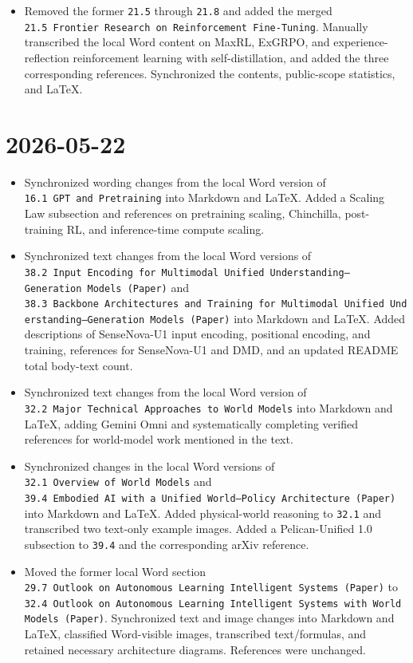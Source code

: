 \begin{itemize}
\item
  Removed the former \texttt{21.5} through \texttt{21.8} and added the merged \texttt{21.5\ Frontier\ Research\ on\ Reinforcement\ Fine-Tuning}. Manually transcribed the local Word content on MaxRL, ExGRPO, and experience-reflection reinforcement learning with self-distillation, and added the three corresponding references. Synchronized the contents, public-scope statistics, and LaTeX.
\end{itemize}

\hypertarget{section-3}{%
\section{2026-05-22}\label{section-3}}

\begin{itemize}
\tightlist
\item
  Synchronized wording changes from the local Word version of \texttt{16.1\ GPT\ and\ Pretraining} into Markdown and LaTeX. Added a Scaling Law subsection and references on pretraining scaling, Chinchilla, post-training RL, and inference-time compute scaling.
\item
  Synchronized text changes from the local Word versions of \texttt{38.2\ Input\ Encoding\ for\ Multimodal\ Unified\ Understanding–Generation\ Models\ (Paper)} and \texttt{38.3\ Backbone\ Architectures\ and\ Training\ for\ Multimodal\ Unified\ Understanding–Generation\ Models\ (Paper)} into Markdown and LaTeX. Added descriptions of SenseNova-U1 input encoding, positional encoding, and training, references for SenseNova-U1 and DMD, and an updated README total body-text count.
\item
  Synchronized text changes from the local Word version of \texttt{32.2\ Major\ Technical\ Approaches\ to\ World\ Models} into Markdown and LaTeX, adding Gemini Omni and systematically completing verified references for world-model work mentioned in the text.
\item
  Synchronized changes in the local Word versions of \texttt{32.1\ Overview\ of\ World\ Models} and \texttt{39.4\ Embodied\ AI\ with\ a\ Unified\ World–Policy\ Architecture\ (Paper)} into Markdown and LaTeX. Added physical-world reasoning to \texttt{32.1} and transcribed two text-only example images. Added a Pelican-Unified 1.0 subsection to \texttt{39.4} and the corresponding arXiv reference.
\item
  Moved the former local Word section \texttt{29.7\ Outlook\ on\ Autonomous\ Learning\ Intelligent\ Systems\ (Paper)} to \texttt{32.4\ Outlook\ on\ Autonomous\ Learning\ Intelligent\ Systems\ with\ World\ Models\ (Paper)}. Synchronized text and image changes into Markdown and LaTeX, classified Word-visible images, transcribed text/formulas, and retained necessary architecture diagrams. References were unchanged.
\end{itemize}

